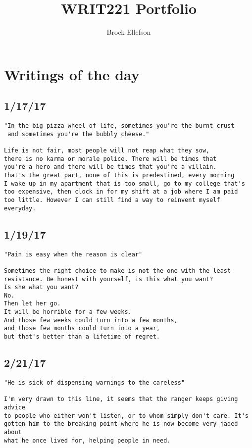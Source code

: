 \documentclass[10pt,letterpaper]{article}
\author{Brock Ellefson}
\title{WRIT221 Portfolio}
\begin{document}
\maketitle
\newpage
\doublespacing
\newpage
\section*{Writings of the day}
\subsection*{1/17/17}
\begin{verbatim}
"In the big pizza wheel of life, sometimes you're the burnt crust
 and sometimes you're the bubbly cheese."

Life is not fair, most people will not reap what they sow, 
there is no karma or morale police. There will be times that
you're a hero and there will be times that you're a villain.
That's the great part, none of this is predestined, every morning 
I wake up in my apartment that is too small, go to my college that's
too expensive, then clock in for my shift at a job where I am paid 
too little. However I can still find a way to reinvent myself everyday.
\end{verbatim}


\subsection*{1/19/17}
\begin{verbatim}
"Pain is easy when the reason is clear"

Sometimes the right choice to make is not the one with the least
resistance. Be honest with yourself, is this what you want?
Is she what you want?
No. 
Then let her go. 
It will be horrible for a few weeks.
And those few weeks could turn into a few months, 
and those few months could turn into a year,
but that's better than a lifetime of regret. 
\end{verbatim}

\subsection*{2/21/17}
\begin{verbatim}
"He is sick of dispensing warnings to the careless"

I'm very drawn to this line, it seems that the ranger keeps giving advice
to people who either won't listen, or to whom simply don't care. It's
gotten him to the breaking point where he is now become very jaded about
what he once lived for, helping people in need.
\end{verbatim}
\end{document}
